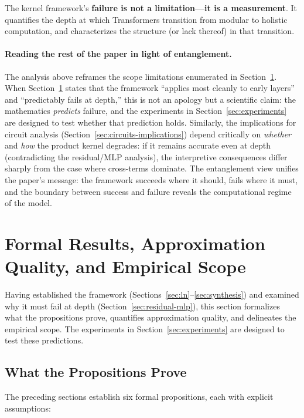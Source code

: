 \documentclass[11pt]{article}
\theoremstyle{definition}
\begin{document}
The kernel framework's \textbf{failure is not a limitation---it is a measurement}. It quantifies the depth at which Transformers transition from modular to holistic computation, and characterizes the structure (or lack thereof) in that transition.

\paragraph{Reading the rest of the paper in light of entanglement.}
The analysis above reframes the scope limitations enumerated in Section~\ref{sec:formal-results}. When Section~\ref{sec:formal-results} states that the framework ``applies most cleanly to early layers'' and ``predictably fails at depth,'' this is not an apology but a scientific claim: the mathematics \emph{predicts} failure, and the experiments in Section~\ref{sec:experiments} are designed to test whether that prediction holds. Similarly, the implications for circuit analysis (Section~\ref{sec:circuits-implications}) depend critically on \emph{whether} and \emph{how} the product kernel degrades: if it remains accurate even at depth (contradicting the residual/MLP analysis), the interpretive consequences differ sharply from the case where cross-terms dominate. The entanglement view unifies the paper's message: the framework succeeds where it should, fails where it must, and the boundary between success and failure reveals the computational regime of the model.

\section{Formal Results, Approximation Quality, and Empirical Scope}
\label{sec:formal-results}

Having established the framework (Sections~\ref{sec:ln}--\ref{sec:synthesis}) and examined why it must fail at depth (Section~\ref{sec:residual-mlp}), this section formalizes what the propositions prove, quantifies approximation quality, and delineates the empirical scope. The experiments in Section~\ref{sec:experiments} are designed to test these predictions.

\subsection{What the Propositions Prove}

The preceding sections establish six formal propositions, each with explicit assumptions:
\end{document}

